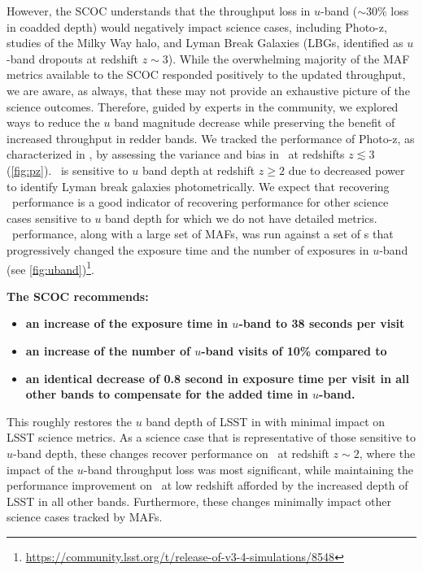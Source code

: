 However, the SCOC understands that the throughput loss in $u$-band ($\sim$30\%  loss in coadded depth) would negatively impact science cases, including Photo-z, studies of the Milky Way halo, and Lyman Break Galaxies (LBGs, identified as $u$-band dropouts at redshift $z\sim3$). While the overwhelming majority of the MAF metrics available to the SCOC responded positively to the updated throughput, we are aware, as always, that these may not provide an exhaustive picture of the science outcomes. Therefore, guided by experts in the community, we explored ways to reduce the $u$ band magnitude decrease while preserving the benefit of increased throughput in redder bands. 
We tracked the performance of Photo-z, as characterized in \citealt{Graham_2017}, by assessing the variance and bias in \pz\ at redshifts $z\lesssim{3}$ (\autoref{fig:pz}). \pz\ is sensitive to $u$ band depth at redshift $z\geq 2$ due to decreased power to identify Lyman break galaxies photometrically. We expect that recovering \pz\ performance is a good indicator of recovering performance for other science cases sensitive to $u$ band depth for which we do not have detailed metrics. \pz\ performance, along with a large set of MAFs, was run against a set of \opsim s  that progressively changed the exposure time and the number of exposures in $u$-band (see \autoref{fig:uband})\footnote{\url{https://community.lsst.org/t/release-of-v3-4-simulations/8548}}. 

{\bf The SCOC recommends:} 

\begin{itemize} 
\item {\bf an increase of the exposure time in $u$-band to 38 seconds per visit}
\item {\bf an increase of the number of $u$-band visits of 10\% compared to }
\item {\bf an identical decrease of 0.8 second in exposure time per visit in all other bands to compensate for the added time in $u$-band.} 
\end{itemize}


This roughly restores the $u$ band depth of LSST in  with minimal impact on LSST science metrics. As a science case that is representative of those sensitive to $u$-band depth, these changes recover performance on \pz\ at redshift $z\sim2$, where the impact of the $u$-band throughput loss was most significant, while maintaining the performance improvement on \pz\ at low redshift afforded by the increased depth of LSST in all other bands. Furthermore, these changes minimally impact other science cases tracked by MAFs. 

